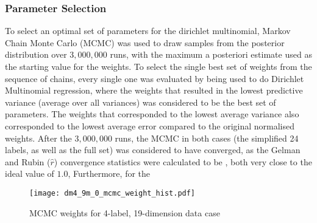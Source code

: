\subsubsection{Parameter Selection}

To select an optimal set of parameters for the dirichlet multinomial, Markov Chain Monte Carlo (MCMC) was used to draw samples from the posterior distribution  over $3,000,000$ runs, with the maximum a posteriori estimate used as the starting value for the weights. To select the single best set of weights from the sequence of chains, every single one was evaluated by being used to do Dirichlet Multinomial regression, where the weights that resulted in the lowest predictive variance (average over all variances) was considered to be the best set of parameters. The weights that corresponded to the lowest average variance also corresponded to the lowest average error compared to the original normalised weights. After the $3,000,000$ runs, the MCMC in both cases (the simplified 24 labels, as well as the full set) was considered to have converged, as the Gelman and Rubin ($\hat{r}$) convergence statistics were calculated to be , both very close to the ideal value of $1.0$, Furthermore, for the 



\begin{figure}[H]
    \centerline{\texttt{[image: dm4\_9m\_0\_mcmc\_weight\_hist.pdf]}}
    \caption{MCMC weights for 4-label, 19-dimension data case }
    \label{fig:4l-mcmc_weights}
\end{figure}

